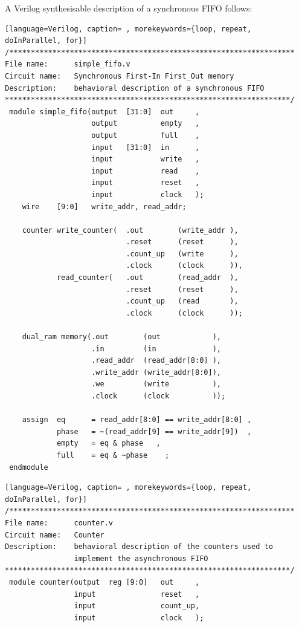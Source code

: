 \begin{simulation} A Verilog synthesisable description of a synchronous
FIFO follows:


{\small
{\em
\begin{shaded*}
\begin{lstlisting}[language=Verilog, caption= , morekeywords={loop, repeat, doInParallel, for}]
/******************************************************************
File name:      simple_fifo.v
Circuit name:   Synchronous First-In First_Out memory
Description:    behavioral description of a synchronous FIFO
******************************************************************/
 module simple_fifo(output  [31:0]  out     ,
                    output          empty   ,
                    output          full    ,
                    input   [31:0]  in      ,
                    input           write   ,
                    input           read    ,
                    input           reset   ,
                    input           clock   );
    wire    [9:0]   write_addr, read_addr;

    counter write_counter(  .out        (write_addr ),
                            .reset      (reset      ),
                            .count_up   (write      ),
                            .clock      (clock      )),
            read_counter(   .out        (read_addr  ),
                            .reset      (reset      ),
                            .count_up   (read       ),
                            .clock      (clock      ));

    dual_ram memory(.out        (out            ),
                    .in         (in             ),
                    .read_addr  (read_addr[8:0] ),
                    .write_addr (write_addr[8:0]),
                    .we         (write          ),
                    .clock      (clock          ));

    assign  eq      = read_addr[8:0] == write_addr[8:0] ,
            phase   = ~(read_addr[9] == write_addr[9])  ,
            empty   = eq & phase   ,
            full    = eq & ~phase    ;
 endmodule
\end{lstlisting}
\end{shaded*}
}
}


{\small
{\em
\begin{shaded*}
\begin{lstlisting}[language=Verilog, caption= , morekeywords={loop, repeat, doInParallel, for}]
/******************************************************************
File name:      counter.v
Circuit name:   Counter
Description:    behavioral description of the counters used to 
                implement the asynchronous FIFO
******************************************************************/
 module counter(output  reg [9:0]   out     ,
                input               reset   ,
                input               count_up,
                input               clock   );


\end{lstlisting}
\end{shaded*}}}
\end{simulation}
